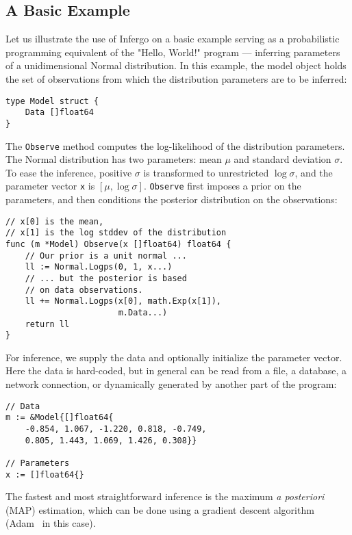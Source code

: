 \documentclass[sigplan,review,10pt,anonymous]{acmart}
\begin{document}
\begin{sloppypar}
\subsection{A Basic Example}

Let us illustrate the use of Infergo on a basic example serving
as a probabilistic programming equivalent of the "Hello, World!"
program --- inferring parameters of a unidimensional Normal
distribution. In this example, the model object holds the set of
observations from which the distribution parameters are to be
inferred:
\begin{lstlisting}
type Model struct {
    Data []float64
}
\end{lstlisting}

The \lstinline{Observe} method computes the log-likelihood of
the distribution parameters. The Normal distribution has two
parameters: mean $\mu$ and standard deviation
$\sigma$. To ease the inference, positive $\sigma$ is transformed to
unrestricted $\log \sigma$, and the parameter vector \lstinline{x} is $[\mu,
\log \sigma]$. \lstinline{Observe} first imposes a prior on the
parameters, and then conditions the posterior distribution on
the observations:

\begin{lstlisting}
// x[0] is the mean,
// x[1] is the log stddev of the distribution
func (m *Model) Observe(x []float64) float64 {
    // Our prior is a unit normal ...
    ll := Normal.Logps(0, 1, x...)
    // ... but the posterior is based 
	// on data observations.
	ll += Normal.Logps(x[0], math.Exp(x[1]),
	                   m.Data...)
    return ll
}
\end{lstlisting}

For inference, we supply the data and optionally initialize the
parameter vector. Here the data is hard-coded, but in general
can be read from a file, a database, a network connection,
or dynamically generated by another part of the program:

\begin{lstlisting}
// Data
m := &Model{[]float64{
	-0.854, 1.067, -1.220, 0.818, -0.749,
	0.805, 1.443, 1.069, 1.426, 0.308}}

// Parameters
x := []float64{}
\end{lstlisting}
	
The fastest and most straightforward inference is the maximum
\textit{a posteriori} (MAP) estimation, which can be done using
a gradient descent algorithm (Adam~\cite{KB15} in this case).


\end{sloppypar}
\end{document}
